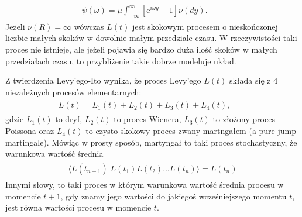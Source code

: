\documentclass[a4paper,12pt,polish]{sphinxmanual}
\begin{document}
\label{ch3/chIII021:equation-eqn55}\begin{gather}
\begin{split}\psi(\omega) = \mu \int_{-\infty}^{\infty} \left[\mbox{e}^{i\omega y} - 1 \right] \nu (dy). \qquad\end{split}\label{ch3/chIII021-eqn55}
\end{gather}
Jeżeli $\nu(R) = \infty$ wówczas $L(t)$ jest skokowym procesem o nieskończonej liczbie małych skoków w dowolnie małym przedziale czasu. W rzeczywistości taki proces nie istnieje, ale jeżeli pojawia się bardzo duża ilość skoków w małych przedziałach czasu, to przybliżenie takie dobrze modeluje układ.

Z twierdzenia Levy'ego-Ito wynika, że proces Levy'ego $L(t)$ składa się z 4 niezależnych procesów elementarnych:
\label{ch3/chIII021:equation-eqn56}\begin{gather}
\begin{split}L(t)=L_1(t) +L_2(t) + L_3(t) + L_4(t), \qquad\end{split}\label{ch3/chIII021-eqn56}
\end{gather}
gdzie $L_1(t)$ to dryf, $L_2(t)$ to proces Wienera, $L_3(t)$ to złożony proces Poissona oraz $L_4(t)$ to czysto skokowy proces zwany martngałem (a pure jump martingale). Mówiąc w prosty sposób, martyngał to taki proces stochastyczny, że warunkowa wartość średnia
\label{ch3/chIII021:equation-eqn57}\begin{gather}
\begin{split}\langle L(t_{n+1})|L(t_{1}) L(t_{2})... L(t_{n})\rangle = L(t_{n})\end{split}\label{ch3/chIII021-eqn57}
\end{gather}
Innymi słowy, to taki proces w którym warunkowa wartość średnia procesu w momencie $t+1$, gdy znamy jego wartości do jakiegoś wcześniejszego momentu $t$, jest równa wartości procesu w momencie $t$.
\end{document}
